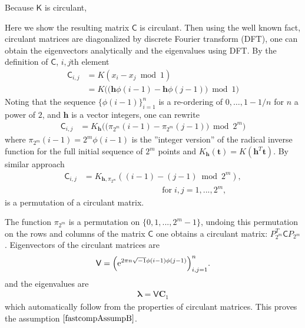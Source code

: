 \documentclass[twocolumn]{svjour3}          %
\newcommand{\bm}[1]{\boldsymbol{#1}}
\newcommand{\vlambda}{{\bm{\lambda}}}
\newcommand{\vC}{\bm{C}}
\newcommand{\vh}{\bm{h}}
\newcommand{\vt}{\bm{t}}
\newcommand{\mC}{\mathsf{C}}
\newcommand{\mK}{\mathsf{K}}
\newcommand{\mV}{\mathsf{V}}
\newcommand{\me}{\mathrm{e}}
\begin{document}
Because $\mK$ is circulant,














Here we show the resulting matrix $\mC$ is circulant.
Then using the well known fact, circulant matrices are diagonalized by discrete Fourier transform (DFT), one can obtain the eigenvectors analytically and the eigenvalues using DFT.
By the definition of $\mC$, $i,j$th element
\begin{align*}
\mC_{i,j} & = K( x_i - x_j \bmod 1 ) \\
&= K\bigl( \bigl(\vh \phi(i-1) - \vh \phi(j-1)\bigr) \bmod 1 \bigr) 
\end{align*}
Noting that the sequence $\{\phi(i-1)\}_{i=1}^n$ is a re-ordering of $0, \ldots, 1-1/n$ for $n$ a power of $2$, and $\vh$ is a vector integers, one can rewrite
\begin{align*}
\mC_{i,j} &= K_{\vh}\bigl( \bigl(\pi_{2^m}(i-1) - \pi_{2^m}(j-1)\bigr) \bmod 2^m \bigr)
\end{align*}
where $\pi_{2^m}(i-1) = 2^m\phi(i-1)$ is the ''integer version'' of the radical inverse function for the full initial sequence of $2^m$ points and $K_{\vh}(\vt) = K(\vh^T \vt)$. By similar approach
\begin{align*}
\mC_{i,j} &= K_{\vh,\pi_{2^m}}( (i-1) - (j-1) \bmod 2^m ) , 
\\
& \hspace{4cm} \text{for}\; i,j=1,...,2^m ,
\end{align*}
is a permutation of a circulant matrix.
 
The function $\pi_{2^m}$ is a permutation on $\{0, 1, ..., 2^m-1\}$, undoing this
permutation on the rows and columns of the matrix $\mC$ one obtains a circulant
matrix:
$P_{2^m}^T \mC P_{2^m}$.
Eigenvectors of the circulant matrices are 
\begin{align} \label{latticeVdef}
\mV = \Bigl ( \me^{2 \pi n \sqrt{-1} \phi(i-1)\phi(j-1)} \Bigr)_{i,j = 1}^n.
\end{align}
and the eigenvalues are
\begin{align*}
\vlambda = \mV \vC_1
\end{align*}
which automatically follow from the properties of circulant matrices.
This proves the assumption $\eqref{fastcompAssumpB}$.
\end{document}
